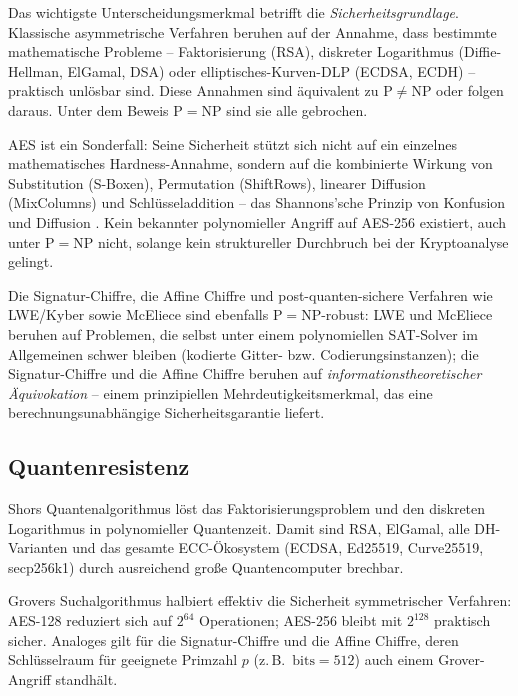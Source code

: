 ﻿\documentclass[a4paper,12pt]{scrreprt}
\theoremstyle{definition}
\begin{document}
Das wichtigste Unterscheidungsmerkmal betrifft die \emph{Sicherheitsgrundlage}. Klassische asymmetrische Verfahren beruhen auf der Annahme, dass bestimmte mathematische Probleme -- Faktorisierung (RSA), diskreter Logarithmus (Diffie-Hellman, ElGamal, DSA) oder elliptisches-Kurven-DLP (ECDSA, ECDH) -- praktisch unlösbar sind. Diese Annahmen sind äquivalent zu $\mathrm{P}\neq\mathrm{NP}$ oder folgen daraus. Unter dem Beweis $\mathrm{P}=\mathrm{NP}$ \cite{Epp26a} sind sie alle gebrochen.

AES \cite{DR02} ist ein Sonderfall: Seine Sicherheit stützt sich nicht auf ein einzelnes mathematisches Hardness-Annahme, sondern auf die kombinierte Wirkung von Substitution (S-Boxen), Permutation (ShiftRows), linearer Diffusion (MixColumns) und Schlüsseladdition -- das Shannons'sche Prinzip von Konfusion und Diffusion \cite{Sha49}. Kein bekannter polynomieller Angriff auf AES-256 existiert, auch unter $\mathrm{P}=\mathrm{NP}$ nicht, solange kein struktureller Durchbruch bei der Kryptoanalyse gelingt.

Die Signatur-Chiffre, die Affine Chiffre \cite{Epp26c} und post-quanten-sichere Verfahren wie LWE/Kyber \cite{ABD+22} sowie McEliece \cite{McE78} sind ebenfalls $\mathrm{P}=\mathrm{NP}$-robust: LWE und McEliece beruhen auf Problemen, die selbst unter einem polynomiellen SAT-Solver im Allgemeinen schwer bleiben (kodierte Gitter- bzw. Codierungsinstanzen); die Signatur-Chiffre und die Affine Chiffre beruhen auf \emph{informationstheoretischer Äquivokation} -- einem prinzipiellen Mehrdeutigkeitsmerkmal, das eine berechnungsunabhängige Sicherheitsgarantie liefert.

\subsection{Quantenresistenz}

Shors Quantenalgorithmus \cite{Sho94} löst das Faktorisierungsproblem und den diskreten Logarithmus in polynomieller Quantenzeit. Damit sind RSA, ElGamal, alle DH-Varianten und das gesamte ECC-Ökosystem (ECDSA, Ed25519, Curve25519, secp256k1) durch ausreichend große Quantencomputer brechbar.

Grovers Suchalgorithmus \cite{Gro96} halbiert effektiv die Sicherheit symmetrischer Verfahren: AES-128 reduziert sich auf $2^{64}$ Operationen; AES-256 bleibt mit $2^{128}$ praktisch sicher. Analoges gilt für die Signatur-Chiffre und die Affine Chiffre, deren Schlüsselraum für geeignete Primzahl $p$ (z.\,B.\ $\mathrm{bits}=512$) auch einem Grover-Angriff standhält.
\end{document}
